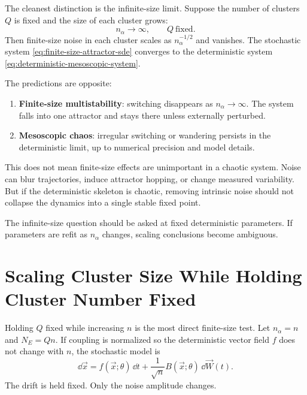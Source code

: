 The cleanest distinction is the infinite-size limit. Suppose the number of clusters $Q$ is fixed and the size of each cluster grows:
%
\begin{equation}
  n_{\alpha}\to\infty,
  \qquad
  Q \ \text{fixed}.
  \label{eq:fixed-q-large-clusters}
\end{equation}
%
Then finite-size noise in each cluster scales as $n_{\alpha}^{-1/2}$ and vanishes. The stochastic system \eqref{eq:finite-size-attractor-sde} converges to the deterministic system \eqref{eq:deterministic-mesoscopic-system}.

The predictions are opposite:
%
\begin{enumerate}[leftmargin=*]
  \item \textbf{Finite-size multistability}: switching disappears as $n_{\alpha}\to\infty$. The system falls into one attractor and stays there unless externally perturbed.
  \item \textbf{Mesoscopic chaos}: irregular switching or wandering persists in the deterministic limit, up to numerical precision and model details.
\end{enumerate}

This does not mean finite-size effects are unimportant in a chaotic system. Noise can blur trajectories, induce attractor hopping, or change measured variability. But if the deterministic skeleton is chaotic, removing intrinsic noise should not collapse the dynamics into a single stable fixed point.

The infinite-size question should be asked at fixed deterministic parameters. If parameters are refit as $n_{\alpha}$ changes, scaling conclusions become ambiguous.

\section{Scaling Cluster Size While Holding Cluster Number Fixed}
\label{sec:scaling-cluster-size-fixed-number}

Holding $Q$ fixed while increasing $n$ is the most direct finite-size test. Let $n_{\alpha}=n$ and $N_E=Qn$. If coupling is normalized so the deterministic vector field $f$ does not change with $n$, the stochastic model is
%
\begin{equation}
  \dd \vec x
  =
  f(\vec x;\theta)\,\dd t
  +
  \frac{1}{\sqrt n}B(\vec x;\theta)\,\dd \vec W(t).
  \label{eq:fixed-q-size-scaling}
\end{equation}
%
The drift is held fixed. Only the noise amplitude changes.

